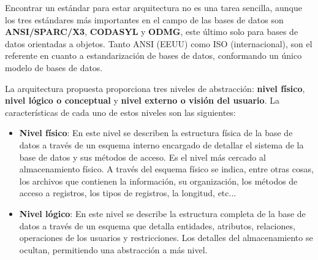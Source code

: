 Encontrar un estándar para estar arquitectura no es una tarea sencilla, aunque los tres estándares más importantes en el campo de las bases de datos son \textbf{ANSI/SPARC/X3}, \textbf{CODASYL} y \textbf{ODMG}, este último solo para bases de datos orientadas a objetos. Tanto ANSI (EEUU) como ISO (internacional), son el referente en cuanto a estandarización de bases de datos, conformando un único modelo de bases de datos.

La arquitectura propuesta proporciona tres niveles de abstracción: \textbf{nivel físico}, \textbf{nivel lógico o conceptual} y \textbf{nivel externo o visión del usuario}. La características de cada uno de estos niveles son las siguientes:

\begin{itemize}
    \item \textbf{Nivel físico}: En este nivel se describen la estructura física de la base de datos a través de un esquema interno encargado de detallar el sistema de la base de datos y sus métodos de acceso. Es el nivel más cercado al almacenamiento físico. A través del esquema físico se indica, entre otras cosas, los archivos que contienen la información, su organización, los métodos de acceso a registros, los tipos de registros, la longitud, etc...

    \item \textbf{Nivel lógico}: En este nivel se describe la estructura completa de la base de datos a través de un esquema que detalla entidades, atributos, relaciones, operaciones de los usuarios y restricciones. Los detalles del almacenamiento se ocultan, permitiendo una abstracción a más nivel.
\end{itemize}



\glsaddall
\printglossaries


\newpage
{}



